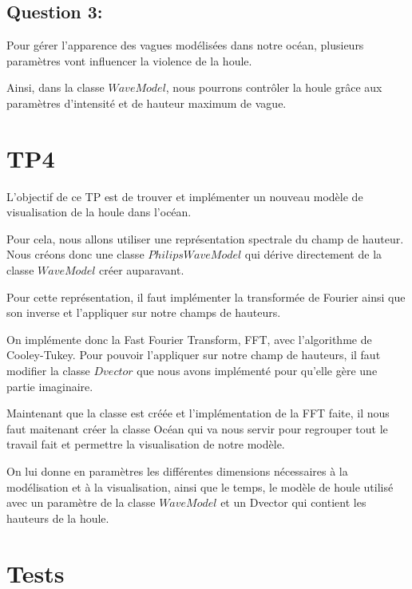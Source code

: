 \documentclass{article}
\begin{document}
\vspace{0.5cm}

\subsection{Question 3:}

Pour gérer l'apparence des vagues modélisées dans notre océan, plusieurs paramètres vont influencer la violence de la houle.

Ainsi, dans la classe $WaveModel$, nous pourrons contrôler la houle grâce aux paramètres d'intensité et de hauteur maximum de vague.

\vspace{1cm}

\section{TP4}

L'objectif de ce TP est de trouver et implémenter un nouveau modèle de visualisation de la houle dans l'océan.

Pour cela, nous allons utiliser une représentation spectrale du champ de hauteur. Nous créons donc une classe $PhilipsWaveModel$ qui dérive directement de la classe $WaveModel$ créer auparavant.

Pour cette représentation, il faut implémenter la transformée de Fourier ainsi que son inverse et l'appliquer sur notre champs de hauteurs.

On implémente donc la Fast Fourier Transform, FFT, avec l'algorithme de Cooley-Tukey. Pour pouvoir l'appliquer sur notre champ de hauteurs, il faut modifier la classe $Dvector$ que nous avons implémenté pour qu'elle gère une partie imaginaire.


Maintenant que la classe est créée et l'implémentation de la FFT faite, il nous faut maitenant créer la classe Océan qui va nous servir pour regrouper tout le travail fait et permettre la visualisation de notre modèle.

On lui donne en paramètres les différentes dimensions nécessaires à la modélisation et à la visualisation, ainsi que le temps, le modèle de houle utilisé avec un paramètre de la classe $WaveModel$ et un Dvector qui contient les hauteurs de la houle.

\vspace{1cm}

\section{Tests}
\end{document}
